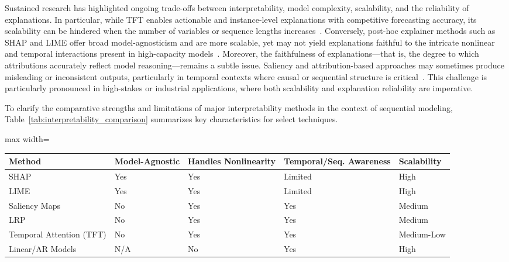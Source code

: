 \documentclass[sigconf]{acmart}
\begin{document}
Sustained research has highlighted ongoing trade-offs between interpretability, model complexity, scalability, and the reliability of explanations. In particular, while TFT enables actionable and instance-level explanations with competitive forecasting accuracy, its scalability can be hindered when the number of variables or sequence lengths increases~\cite{ref31}\cite{ref62}\cite{ref67}. Conversely, post-hoc explainer methods such as SHAP and LIME offer broad model-agnosticism and are more scalable, yet may not yield explanations faithful to the intricate nonlinear and temporal interactions present in high-capacity models~\cite{ref31}\cite{ref67}\cite{ref69}\cite{ref79}. Moreover, the faithfulness of explanations—that is, the degree to which attributions accurately reflect model reasoning—remains a subtle issue. Saliency and attribution-based approaches may sometimes produce misleading or inconsistent outputs, particularly in temporal contexts where causal or sequential structure is critical~\cite{ref55}\cite{ref86}. This challenge is particularly pronounced in high-stakes or industrial applications, where both scalability and explanation reliability are imperative.

To clarify the comparative strengths and limitations of major interpretability methods in the context of sequential modeling, Table~\ref{tab:interpretability_comparison} summarizes key characteristics for select techniques.

\begin{table*}[htbp]
\centering
\caption{Comparative overview of interpretability approaches for time series and sequential models.}
\label{tab:interpretability_comparison}
\begin{adjustbox}{max width=\textwidth}
\begin{tabular}{lllll}
\toprule
\textbf{Method} & \textbf{Model-Agnostic} & \textbf{Handles Nonlinearity} & \textbf{Temporal/Seq. Awareness} & \textbf{Scalability} \\
\midrule
SHAP                    & Yes   & Yes        & Limited     & High   \\
LIME                    & Yes   & Yes        & Limited     & High   \\
Saliency Maps           & No    & Yes        & Yes         & Medium \\
LRP                     & No    & Yes        & Yes         & Medium \\
Temporal Attention (TFT)& No    & Yes        & Yes         & Medium-Low \\
Linear/AR Models        & N/A   & No         & Yes         & High   \\
\bottomrule
\end{tabular}
\end{adjustbox}
\end{table*}
\end{document}
